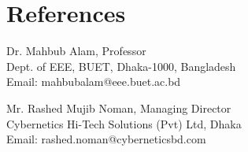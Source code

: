 \documentclass[a4paper,20pt]{article}
\begin{document}
\vspace{2pt}
\section{\textbf{References}}
\begin{minipage}[t]{0.49\textwidth}
Dr. Mahbub Alam, Professor \\
Dept. of EEE, BUET, Dhaka-1000, Bangladesh \\
Email: mahbubalam@eee.buet.ac.bd
\end{minipage}\hfill
\begin{minipage}[t]{0.49\textwidth}
Mr. Rashed Mujib Noman, Managing Director \\
Cybernetics Hi-Tech Solutions (Pvt) Ltd, Dhaka \\
Email: rashed.noman@cyberneticsbd.com
\end{minipage}
\end{document}
